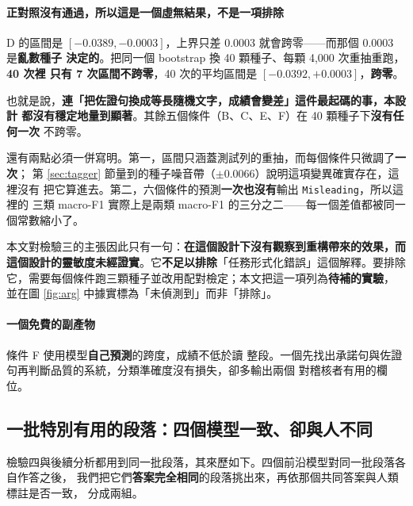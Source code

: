 \documentclass[11pt,a4paper]{ctexart}
\newcommand{\fn}[1]{\texttt{#1}}
\begin{document}
\paragraph{正對照沒有通過，所以這是一個虛無結果，不是一項排除} D 的區間是
$[-0.0389, -0.0003]$，上界只差 0.0003 就會跨零——而那個 $0.0003$ 是\textbf{亂數種子
決定的}。把同一個 bootstrap 換 40 顆種子、每顆 4{,}000 次重抽重跑，\textbf{40 次裡
只有 7 次區間不跨零}，40 次的平均區間是 $[-0.0392, +0.0003]$，\textbf{跨零}。

\medskip
也就是說，\textbf{連「把佐證句換成等長隨機文字，成績會變差」這件最起碼的事，本設計
都沒有穩定地量到顯著}。其餘五個條件（B、C、E、F）在 40 顆種子下\textbf{沒有任何一次}
不跨零。

\medskip
還有兩點必須一併寫明。第一，區間只涵蓋測試列的重抽，而每個條件只微調了\textbf{一次}；
第 \ref{sec:tagger} 節量到的種子噪音帶（$\pm0.0066$）說明這項變異確實存在，這裡沒有
把它算進去。第二，六個條件的預測\textbf{一次也沒有}輸出 \fn{Misleading}，所以這裡的
三類 macro-F1 實際上是兩類 macro-F1 的三分之二——每一個差值都被同一個常數縮小了。

\begin{tcolorbox}[colback=gray!8, colframe=gray!55]
本文對檢驗三的主張因此只有一句：\textbf{在這個設計下沒有觀察到重構帶來的效果，而
這個設計的靈敏度未經證實}。它\textbf{不足以排除}「任務形式化錯誤」這個解釋。要排除
它，需要每個條件跑三顆種子並改用配對檢定；本文把這一項列為\textbf{待補的實驗}，
並在圖 \ref{fig:arg} 中據實標為「未偵測到」而非「排除」。
\end{tcolorbox}

\paragraph{一個免費的副產物} 條件 F 使用模型\textbf{自己預測}的跨度，成績不低於讀
整段。一個先找出承諾句與佐證句再判斷品質的系統，分類準確度沒有損失，卻多輸出兩個
對稽核者有用的欄位。

\subsection{一批特別有用的段落：四個模型一致、卻與人不同}
\label{sec:split}

檢驗四與後續分析都用到同一批段落，其來歷如下。四個前沿模型對同一批段落各自作答之後，
我們把它們\textbf{答案完全相同}的段落挑出來，再依那個共同答案與人類標註是否一致，
分成兩組。
\end{document}

